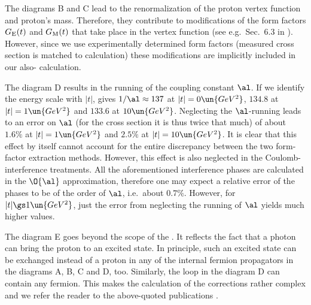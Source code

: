 The diagrams  B and C lead to the renormalization of the proton vertex function and proton's mass. Therefore, they contribute to modifications of the form factors $G_{\rm E}(t)$ and $G_{\rm M}(t)$ that take place in the  vertex function (see e.g.~Sec.~6.3 in ). However, since we use experimentally determined form factors (measured cross section is matched to  calculation) these modifications are implicitly included in our also- calculation.

The diagram  D results in the running of the coupling constant $\al$. If we identify the energy scale with $|t|$,  gives $1/\al \approx 137$ at $|t| = 0\un{GeV^2}$, $134.8$ at $|t| = 1 \un{GeV^2}$ and $133.6$ at $10\un{GeV^2}$. Neglecting the $\al$-running leads to an error on $\al$ (for the cross section it is thus twice that much) of about $1.6\percent$ at $|t| = 1 \un{GeV^2}$ and $2.5\percent$ at $|t| = 10 \un{GeV^2}$. It is clear that this effect by itself cannot account for the entire discrepancy between the two form-factor extraction methods. However, this effect is also neglected in the Coulomb-interference treatments. All the aforementioned interference phases are calculated in the $\O{\al}$ approximation, therefore one may expect a relative error of the phases to be of the order of $\al$, i.e.~about $0.7\percent$. However, for $|t| \gs 1\un{GeV^2}$, just the error from neglecting the running of $\al$ yields much higher values.

The diagram  E goes beyond the scope of the . It reflects the fact that a photon can bring the proton to an excited state. In principle, such an excited state can be exchanged instead of a proton in any of the internal fermion propagators in the diagrams A, B, C and D, too. Similarly, the loop in the diagram D can contain any fermion. This makes the calculation of the  corrections rather complex and we refer the reader to the above-quoted publications .


